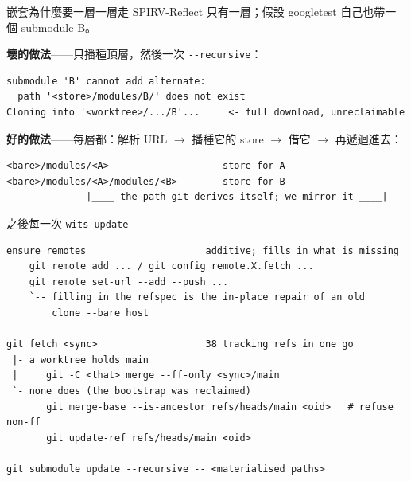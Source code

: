 \begin{frame}[fragile]{嵌套為什麼要一層一層走}
\footnotesize SPIRV-Reflect 只有一層；假設 googletest 自己也帶一個 submodule B。

\medskip
\footnotesize\textbf{壞的做法}——只播種頂層，然後一次 \texttt{-{}-recursive}：
\begin{lstlisting}
submodule 'B' cannot add alternate:
  path '<store>/modules/B/' does not exist
Cloning into '<worktree>/.../B'...     <- full download, unreclaimable
\end{lstlisting}

\footnotesize\textbf{好的做法}——每層都：解析 URL $\rightarrow$ 播種它的 store
$\rightarrow$ 借它 $\rightarrow$ 再遞迴進去：
\begin{lstlisting}
<bare>/modules/<A>                    store for A
<bare>/modules/<A>/modules/<B>        store for B
              |____ the path git derives itself; we mirror it ____|
\end{lstlisting}

\end{frame}

\begin{frame}[fragile]{之後每一次 \texttt{wits update}}
\begin{lstlisting}
ensure_remotes                     additive; fills in what is missing
    git remote add ... / git config remote.X.fetch ...
    git remote set-url --add --push ...
    `-- filling in the refspec is the in-place repair of an old
        clone --bare host

git fetch <sync>                   38 tracking refs in one go
 |- a worktree holds main
 |     git -C <that> merge --ff-only <sync>/main
 `- none does (the bootstrap was reclaimed)
       git merge-base --is-ancestor refs/heads/main <oid>   # refuse non-ff
       git update-ref refs/heads/main <oid>

git submodule update --recursive -- <materialised paths>
\end{lstlisting}

\end{frame}
